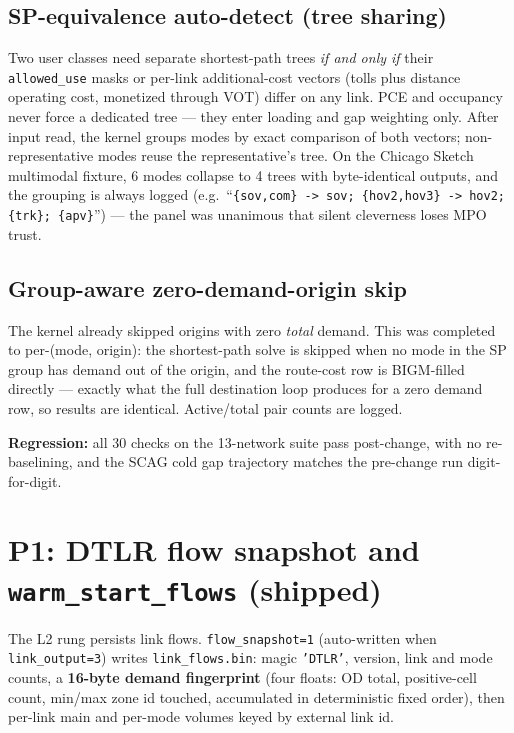 \documentclass[10pt]{article}
\newcommand{\code}[1]{\texttt{#1}}
\begin{document}
\subsection{SP-equivalence auto-detect (tree sharing)}

Two user classes need separate shortest-path trees \emph{if and only if} their
\code{allowed\_use} masks or per-link additional-cost vectors (tolls plus
distance operating cost, monetized through VOT) differ on any link. PCE and
occupancy never force a dedicated tree --- they enter loading and gap weighting
only. After input read, the kernel groups modes by exact comparison of both
vectors; non-representative modes reuse the representative's tree. On the
Chicago Sketch multimodal fixture, 6 modes collapse to 4 trees with
byte-identical outputs, and the grouping is always logged (e.g.\
``\code{\{sov,com\} -> sov; \{hov2,hov3\} -> hov2; \{trk\}; \{apv\}}'') ---
the panel was unanimous that silent cleverness loses MPO trust.

\subsection{Group-aware zero-demand-origin skip}

The kernel already skipped origins with zero \emph{total} demand. This was
completed to per-(mode, origin): the shortest-path solve is skipped when no
mode in the SP group has demand out of the origin, and the route-cost row is
BIGM-filled directly --- exactly what the full destination loop produces for a
zero demand row, so results are identical. Active/total pair counts are logged.

\textbf{Regression:} all 30 checks on the 13-network suite pass post-change,
with no re-baselining, and the SCAG cold gap trajectory matches the pre-change
run digit-for-digit.

\section{P1: DTLR flow snapshot and \code{warm\_start\_flows} (shipped)}

The L2 rung persists link flows. \code{flow\_snapshot=1} (auto-written when
\code{link\_output=3}) writes \code{link\_flows.bin}: magic \code{'DTLR'},
version, link and mode counts, a \textbf{16-byte demand fingerprint} (four
floats: OD total, positive-cell count, min/max zone id touched, accumulated in
deterministic fixed order), then per-link main and per-mode volumes keyed by
external link id.
\end{document}
